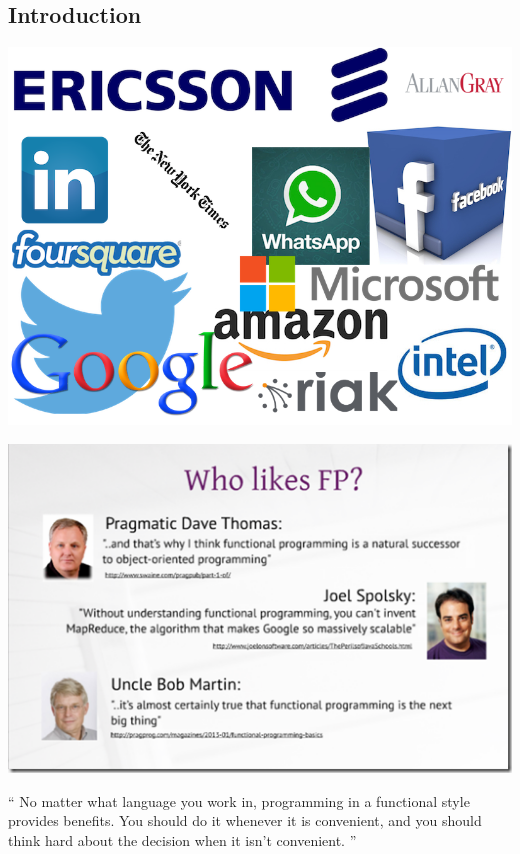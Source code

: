 \documentclass[mathserif]{beamer}
\begin{document}
\subsection{Introduction}

\begin{frame}
  \begin{center}
    \includegraphics[scale=0.3]{img/cufp.png}
  \end{center}
\end{frame}

\begin{frame}
  \begin{center}
    \includegraphics[scale=0.8]{img/WhoLikesFP.png}
  \end{center}
\end{frame}

\begin{frame}
  \begin{exampleblock}{}
    {\Large ``
      No matter what language you work in, programming
      in a functional style provides benefits.
      You should do it whenever it is convenient, and you
      should think hard about the decision when it isn’t convenient.
      ''}
    \vskip5mm
    \hspace*{}
  \end{exampleblock}
\end{frame}
\end{document}
